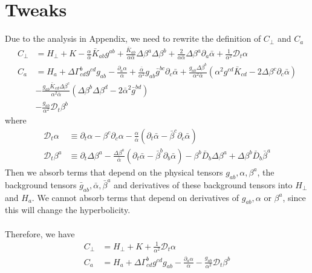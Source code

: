 \documentclass{article}
\begin{document}
\section{Tweaks}
Due to the analysis in Appendix, we need to rewrite the definition of $C_{\perp}$ and $C_{a}$
\begin{align*}
C_{\perp} & = H_{\perp} + K - \frac{\alpha}{{\bar \alpha}}{\bar K}_{ab}g^{ab} + \frac{{\bar K}_{ab}}{\alpha{\bar \alpha}}\Delta \beta^{a} \Delta \beta^{b} + \frac{2}{\alpha {\bar \alpha}}\Delta \beta^{a} \partial_{a}{\bar \alpha} + \frac{1}{\alpha^{2}}\mathscr{D}_{t}\alpha\\
C_{a} & = H_{a} + \Delta \Gamma^{b}_{cd}g^{cd}g_{ab} - \frac{\partial_{a}\alpha}{\alpha} + \frac{{\bar \alpha}}{\alpha^2}g_{ab}{\bar g}^{bc}\partial_{c}{\bar \alpha} + \frac{g_{ab}\Delta \beta^{b}}{\alpha^2 {\bar \alpha}}(\alpha^2g^{cd}{\bar K}_{cd} - 2\Delta\beta^{c}\partial_{c}{\bar \alpha})\\
& - \frac{g_{ab}{\bar K}_{cd}\Delta \beta^{c}}{\alpha^2{\bar \alpha}}(\Delta \beta^{b}\Delta \beta^{d} - 2{\bar \alpha}^2{\bar g}^{bd})\\
& -  \frac{g_{ab}}{\alpha^2}\mathscr{D}_{t}\beta^{b}
\end{align*}
where
\begin{align*}
\mathscr{D}_{t}\alpha & \equiv \partial_{t}\alpha - \beta^{c}\partial_{c}\alpha - \frac{\alpha}{{\bar \alpha}}\left(\partial_{t}{\bar \alpha} - {\bar \beta}^{c}\partial_{c}{\bar \alpha}\right)\\
\mathscr{D}_{t}\beta^{a} &\equiv \partial_{t}\Delta \beta^{a} - \frac{\Delta \beta^{a}}{{\bar \alpha}}\left(\partial_{t}{\bar \alpha} - {\bar \beta}^{b}\partial_{b}{\bar \alpha}\right) - \beta^{b}{\bar D}_{b}\Delta \beta^{a} + \Delta \beta^{b}{\bar D}_{b}{\bar \beta}^{a}
\end{align*}
Then we absorb terms that depend on the physical tensors $g_{ab}, \alpha, \beta^{a}$, the background tensors ${\bar g}_{ab}, {\bar \alpha}, {\bar \beta}^{a}$ and derivatives of these background tensors into $H_{\perp}$ and $H_{a}$. We cannot absorb terms that depend on derivatives of $g_{ab}, \alpha$ or $\beta^{a}$, since this will change the hyperbolicity. \\
\\
Therefore, we have
\begin{align*}
C_{\perp} & = H_{\perp} + K + \frac{1}{\alpha^{2}}\mathscr{D}_{t}\alpha\\
C_{a} & = H_{a} + \Delta \Gamma^{b}_{cd}g^{cd}g_{ab} - \frac{\partial_{a}\alpha}{\alpha} - \frac{g_{ab}}{\alpha^2}\mathscr{D}_{t}\beta^{b}
\end{align*}
\end{document}

